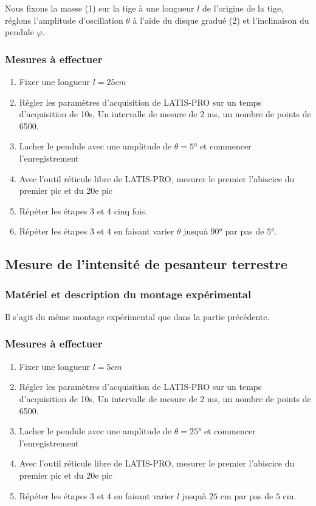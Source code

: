 \documentclass[a4paper,10pt,french]{scrartcl}
\begin{document}
Nous fixons la masse (1) sur la tige à une longueur \(l\) de l'origine de la tige, réglons l'amplitude d'oscillation \(\theta\) à l'aide du disque gradué (2) et l'inclinaison du pendule \(\varphi\).
\subsubsection{Mesures à effectuer}
\begin{enumerate}
 \item Fixer une longueur \(l = 25 cm\)
 \item Régler les paramètres d'acquisition de LATIS-PRO sur un temps d'acquisition de 10s, Un intervalle de mesure de 2 ms, un nombre de points de 6500.
 \item Lacher le pendule avec une amplitude de \(\theta = 5°\) et commencer l'enregistrement
 \item Avec l'outil réticule libre de LATIS-PRO, mesurer le premier l'abiscice du premier pic et du 20e pic
 \item Répéter les étapes 3 et 4 cinq fois.
 \item Répéter les étapes 3 et 4 en faisant varier \(\theta\) jusquà \(90°\) par pas de \(5°\).
\end{enumerate}
\subsection{Mesure de l'intensité de pesanteur terrestre}
\subsubsection{Matériel et description du montage expérimental}
Il s'agit du m\^eme montage expérimental que dans la partie précédente.
\subsubsection{Mesures à effectuer}
\begin{enumerate}
 \item Fixer une longueur \(l = 5 cm\)
 \item Régler les paramètres d'acquisition de LATIS-PRO sur un temps d'acquisition de 10s, Un intervalle de mesure de 2 ms, un nombre de points de 6500.
 \item Lacher le pendule avec une amplitude de \(\theta = 25°\) et commencer l'enregistrement
 \item Avec l'outil réticule libre de LATIS-PRO, mesurer le premier l'abiscice du premier pic et du 20e pic
 \item Répéter les étapes 3 et 4 en faisant varier \(l\) jusquà \(25\) cm par pas de \(5\) cm.
\end{enumerate}
\end{document}
